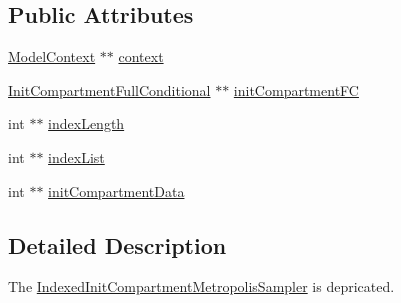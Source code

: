 \subsection*{Public Attributes}
\begin{DoxyCompactItemize}
\item 
\hyperlink{classSpatialSEIR_1_1ModelContext}{Model\-Context} $\ast$$\ast$ \hyperlink{classSpatialSEIR_1_1IndexedInitCompartmentMetropolisSampler_a9cd2c0c4c1ac2a2c22fd977d79756173}{context}
\item 
\hyperlink{classSpatialSEIR_1_1InitCompartmentFullConditional}{Init\-Compartment\-Full\-Conditional} $\ast$$\ast$ \hyperlink{classSpatialSEIR_1_1IndexedInitCompartmentMetropolisSampler_a8c747dd4513ff2df6e5780b2f00cc99b}{init\-Compartment\-F\-C}
\item 
int $\ast$$\ast$ \hyperlink{classSpatialSEIR_1_1IndexedInitCompartmentMetropolisSampler_a41fc7cdd1c6907172dbf51609fe81470}{index\-Length}
\item 
int $\ast$$\ast$ \hyperlink{classSpatialSEIR_1_1IndexedInitCompartmentMetropolisSampler_adfb486cecdbbc3a605465e9ff709ae24}{index\-List}
\item 
int $\ast$$\ast$ \hyperlink{classSpatialSEIR_1_1IndexedInitCompartmentMetropolisSampler_a5da3f9b3df2693b8b87530c261385d46}{init\-Compartment\-Data}
\end{DoxyCompactItemize}


\subsection{Detailed Description}
The \hyperlink{classSpatialSEIR_1_1IndexedInitCompartmentMetropolisSampler}{Indexed\-Init\-Compartment\-Metropolis\-Sampler} is depricated. 

